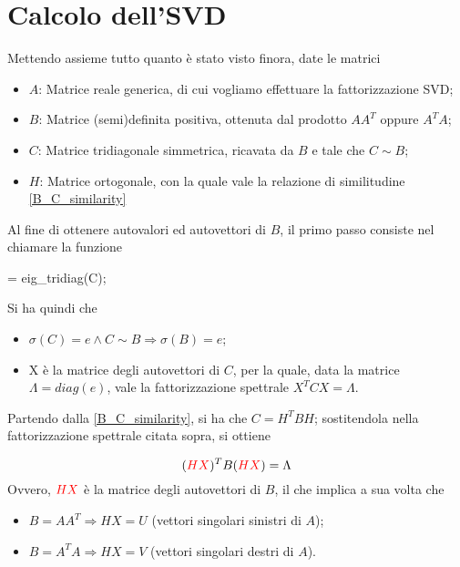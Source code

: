 \section{Calcolo dell'SVD}
Mettendo assieme tutto quanto è stato visto finora, date le matrici
\begin{itemize}
	\item $A$: Matrice reale generica, di cui vogliamo effettuare la 
fattorizzazione SVD;
	\item $B$: Matrice (semi)definita positiva, ottenuta dal prodotto $A A^T$ 
oppure $A^T A$;
	\item $C$: Matrice tridiagonale simmetrica, ricavata da $B$ e tale che $C \sim 
B$;
	\item $H$: Matrice ortogonale, con la quale vale la relazione di similitudine 
\eqref{B_C_similarity}
\end{itemize}

Al fine di ottenere autovalori ed autovettori di $B$, il primo passo consiste 
nel chiamare la funzione
\begin{programma}
[X,e] = eig_tridiag(C);
\end{programma}

 Si ha quindi che
 \begin{itemize}
 	\item $\sigma(C) = e \wedge C \sim B \Rightarrow \sigma(B) = e$;
 	\item X è la matrice degli autovettori di $C$, per la quale, data la matrice 
$\Lambda = diag(e)$, vale la fattorizzazione spettrale $X^T C X = \Lambda$.
 \end{itemize}

Partendo dalla \eqref{B_C_similarity}, si ha che $C = H^T B H$; sostitendola 
nella fattorizzazione spettrale citata sopra, si ottiene 

 \begin{equation*}
	(\textcolor{red}{H X})^T B (\textcolor{red}{H X}) = \Lambda
\end{equation*}
Ovvero, $\textcolor{red}{H X}$ è la matrice degli autovettori di $B$, il che 
implica a sua volta che

\begin{itemize}
	\item $B = A A^T \Rightarrow H X = U$ (vettori singolari sinistri di $A$);
	\item $B = A^T A \Rightarrow H X = V$ (vettori singolari destri di $A$).
\end{itemize}

